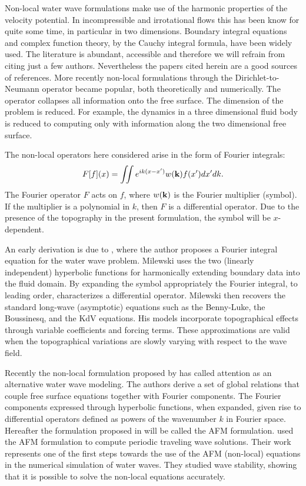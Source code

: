 \documentclass[11pt]{article}
\newcommand{\ka}{\ensuremath{\bold{k}}}
\begin{document}
Non-local water wave formulations make use of the harmonic properties of the velocity potential. In incompressible and 
irrotational flows this has been know for quite some time, in particular in two dimensions. Boundary integral equations
and complex function theory, by the Cauchy  integral formula, have been widely used. The literature is abundant,
accessible and therefore
we will refrain from citing just a few authors. 
Nevertheless the papers cited herein are a  good sources of references. 
More recently non-local formulations through the Dirichlet-to-Neumann operator
became popular, both theoretically and numerically. The operator collapses all information onto the free surface.
The dimension of the problem is reduced. For example, the dynamics in a three dimensional fluid body is reduced
to computing  only with information along the two dimensional free surface.  

The non-local operators here considered  arise in the form of Fourier integrals: 
\begin{equation}
F[f](x) = \int\!\!\! \int e^{ik(x-x^\prime)} w(\ka) f(x^\prime) dx^\prime dk.
\end{equation}  
The Fourier operator $F$  acts on $f$, where $w(\ka)$ is the Fourier multiplier (symbol).  If the multiplier
is a polynomial in $k$, then $F$ is a differential operator. 
Due to the presence of the topography in the present formulation, the symbol will be 
$x$-dependent. 

An early derivation is due to \citet{Paul1998}, where the author proposes a Fourier integral equation for the water wave problem. 
Milewski uses the two (linearly independent) hyperbolic functions for harmonically extending 
boundary data into the fluid domain.
By expanding the symbol  appropriately the Fourier integral, to leading order, characterizes a differential 
operator. Milewski then recovers the standard long-wave (asymptotic) equations such as the Benny-Luke, the 
Boussinesq, and the KdV equations. His models incorporate  topographical effects through 
variable coefficients and forcing terms. These approximations are valid when the topographical 
variations are slowly varying  with respect to the wave field.

Recently the non-local formulation proposed by \cite{AFM}  has called attention as an  
alternative water wave modeling. The authors 
derive a set of global relations that couple free surface equations together with Fourier components. The Fourier 
components expressed through hyperbolic functions, when expanded, given rise to differential operators defined
as powers of the wavenumber $k$ in Fourier space. Hereafter the formulation proposed in 
\cite{AFM} will be called the AFM formulation.
\citet{OliverasDeconinck} used the AFM formulation to compute periodic traveling wave solutions. 
Their work  represents one of the first steps towards the use of the AFM (non-local) equations
in the  numerical simulation of water waves.
They studied wave stability, showing that it is possible to solve the non-local equations accurately. 
\end{document}
